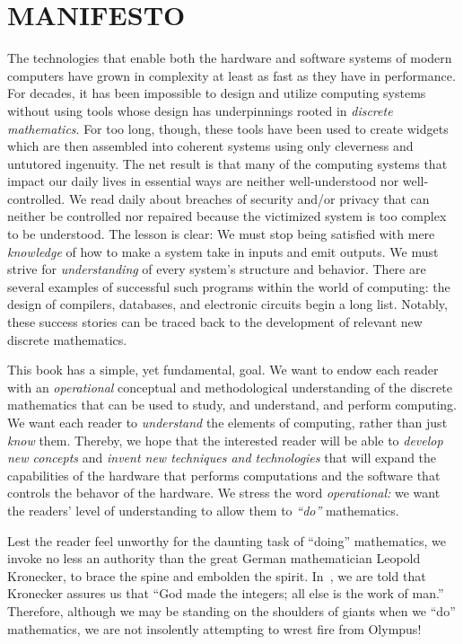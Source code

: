 
\chapter*{MANIFESTO}

The technologies that enable both the hardware and software systems of
modern computers have grown in complexity at least as fast as they
have in performance.  For decades, it has been impossible to design
and utilize computing systems without using tools whose design has
underpinnings rooted in {\it discrete mathematics}.  For too long,
though, these tools have been used to create widgets which are then
assembled into coherent systems using only cleverness and untutored
ingenuity.  The net result is that many of the computing systems that
impact our daily lives in essential ways are neither well-understood
nor well-controlled.  We read daily about breaches of security and/or
privacy that can neither be controlled nor repaired because the
victimized system is too complex to be understood.  The lesson is
clear: We must stop being satisfied with mere {\em knowledge} of how
to make a system take in inputs and emit outputs.  We must strive for
{\em understanding} of every system's structure and behavior.  There
are several examples of successful such programs within the world of
computing: the design of compilers, databases, and electronic circuits
begin a long list.  Notably, these success stories can be traced back
to the development of relevant new discrete mathematics.

This book has a simple, yet fundamental, goal.  We want to endow each
reader with an {\em operational} conceptual and methodological
understanding of the discrete mathematics that can be used to study,
and understand, and perform computing.  We want each reader to {\em
  understand} the elements of computing, rather than just {\em know}
them.  Thereby, we hope that the interested reader will be able to
{\em develop new concepts} and {\em invent new techniques and
  technologies} that will expand the capabilities of the hardware that
performs computations and the software that controls the behavor of
the hardware.  We stress the word {\it operational:} we want the
readers' level of understanding to allow them to {\em ``do''}
mathematics.

\bigskip

Lest the reader feel unworthy for the daunting task of ``doing''
mathematics, we invoke no less an authority than the great German
mathematician Leopold Kronecker,  to brace
the spine and embolden the spirit.  In~\cite{Bell86}, we are told that
Kronecker assures us that ``God made the integers; all else is the
work of man.''  Therefore, although we may be standing on the
shoulders of giants when we ``do'' mathematics, we are not insolently
attempting to wrest fire from Olympus!


